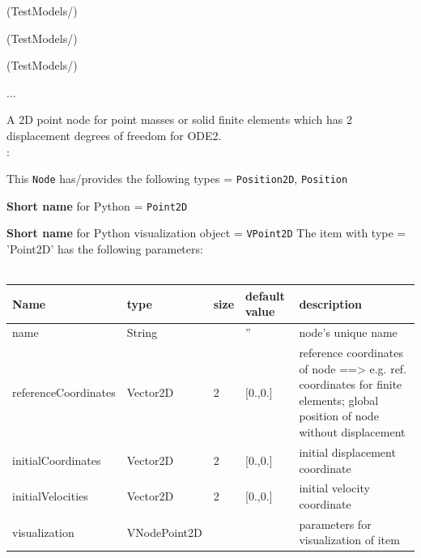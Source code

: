 \item {} (TestModels/)
\item {} (TestModels/)
\item {} (TestModels/)
\item  ...


\ei

%
\newpage


\label{sec:item:NodePoint2D}
A 2D point node for point masses or solid finite elements which has 2 displacement degrees of freedom for \ac{ODE2}.
\vspace{12pt}\\

\noindent {}:
\bi
  \item This \texttt{Node} has/provides the following types = \texttt{Position2D}, \texttt{Position}
  \item {\bf Short name} for Python = \texttt{Point2D}
  \item {\bf Short name} for Python visualization object = \texttt{VPoint2D}
\ei\vspace{12pt} \noindent 
The item  with type = 'Point2D' has the following parameters:
\vspace{-0.5cm}\\
\vspace{-0.5cm}\\
\begin{center}
  \footnotesize
  \begin{longtable}{| p{4.5cm} | p{2.5cm} | p{0.5cm} | p{2.5cm} | p{6cm} |}
    \hline
    \bf Name & \bf type & \bf size & \bf default value & \bf description \\ \hline
    name &     String &      &     '' &     node's unique name\\ \hline
    referenceCoordinates &     Vector2D &     2 &     [0.,0.] &     reference coordinates of node ==> e.g. ref. coordinates for finite elements; global position of node without displacement\\ \hline
    initialCoordinates &     Vector2D &     2 &     [0.,0.] &     initial displacement coordinate\\ \hline
    initialVelocities &     Vector2D &     2 &     [0.,0.] &     initial velocity coordinate\\ \hline
    visualization &     VNodePoint2D &      &      &     parameters for visualization of item\\ \hline
\end{longtable}
\end{center}

